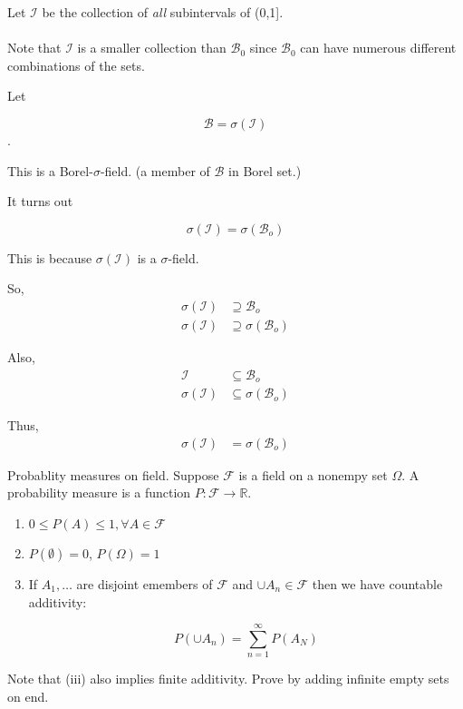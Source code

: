 \documentclass[11pt,fleqn]{book} %
\begin{document}
\begin{example}
	 Let $\mathscr{I}$ be the collection of \textit{all} subintervals of (0,1].\\
	\\
	 Note that $\mathscr{I}$ is a smaller collection than $\mathscr{B}_0$ since $\mathscr{B}_0$ can have numerous different combinations of the sets. 

	 Let

	$$\mathscr{B} = \sigma(\mathscr{I})$$. 

	This is a Borel-$\sigma$-field. (a member of $\mathscr{B}$ in Borel set.)

	It turns out

	$$\sigma(\mathscr{I}) = \sigma(\mathscr{B}_o)  $$

This is because $\sigma(\mathscr{I})$ is a $\sigma$-field. 

So, 
	\begin{align*}
		\sigma(\mathscr{I}) &\supseteq \mathscr{B}_o\\
		\sigma(\mathscr{I}) &\supseteq \sigma(\mathscr{B}_o)
	\end{align*}

Also, 
\begin{align*}
		\mathscr{I} &\subseteq \mathscr{B}_o\\
		\sigma(\mathscr{I}) &\subseteq \sigma(\mathscr{B}_o)
	\end{align*} 

Thus, 
\begin{align*}
	\sigma(\mathscr{I}) &= \sigma(\mathscr{B}_o)
\end{align*}
\end{example}




\begin{definition}

Probablity measures on field. Suppose $\mathscr{F}$ is a field on a nonempy set $\Omega$. A probability measure is a function $P:\mathscr{F} \rightarrow \mathbb{R}$. 

\begin{enumerate}[label = (\roman*)]
	\item $0 \leq P(A) \leq 1, \forall A \in \mathscr{F}$
	\item $P(\emptyset) = 0$, $P(\Omega) = 1$
	\item If $A_1, \dots$ are disjoint emembers of $\mathscr{F}$ and $\cup A_n \in \mathscr{F}$ then we have countable additivity:

	$$P (\cup A_n) = \displaystyle\sum^\infty_{n=1} P(A_N) $$
\end{enumerate}

\begin{remark}
	Note that (iii) also implies finite additivity. Prove by adding infinite empty sets on end. 
\end{remark}

	
\end{definition}
\end{document}
